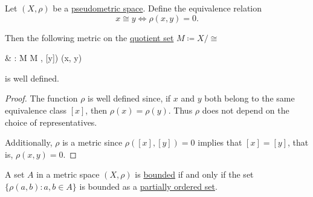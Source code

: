 \begin{proposition}\label{thm:pseudometric_to_metric}
  Let \( (X, \rho) \) be a \hyperref[def:metric_space]{pseudometric space}. Define the equivalence relation
  \begin{equation*}
    x \cong y \iff \rho(x, y) = 0.
  \end{equation*}

  Then the following metric on the \hyperref[thm:equivalence_partition]{quotient set} \( M \coloneqq X / \cong \)
  \begin{balign*}
     & \rho: M \times M \to [0, \infty)    \\
     & \rho([x], [y]) \coloneqq \rho(x, y)
  \end{balign*}
  is well defined.
\end{proposition}
\begin{proof}
  The function \( \rho \) is well defined since, if \( x \) and \( y \) both belong to the same equivalence class \( [x] \), then \( \rho(x) = \rho(y) \). Thus \( \rho \) does not depend on the choice of representatives.

  Additionally, \( \rho \) is a metric since \( \rho([x], [y]) = 0 \) implies that \( [x] = [y] \), that is, \( \rho(x, y) = 0 \).
\end{proof}

\begin{proposition}\label{rem:bounded_set_metric_order_equivalence}
  A set \( A \) in a metric space \( (X, \rho) \) is \hyperref[def:metric_space/bounded_set]{bounded} if and only if the set \( \{ \rho(a, b) \colon a, b \in A \} \) is bounded as a \hyperref[def:partially_ordered_set_extremal_points/upper_and_lower_bounds]{partially ordered set}.
\end{proposition}

